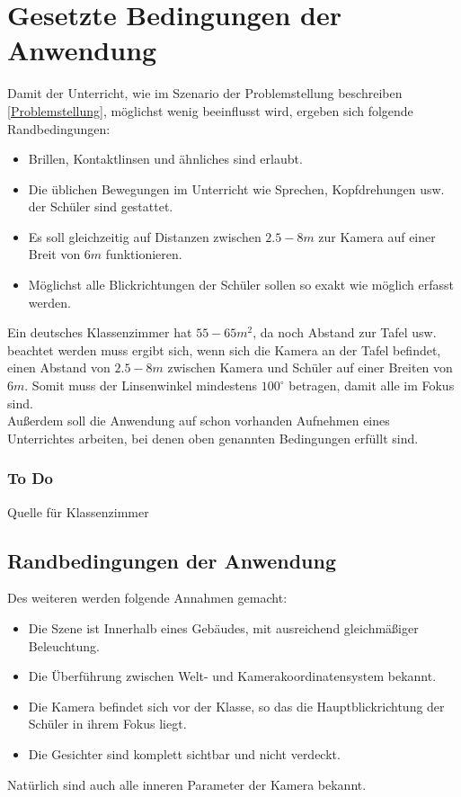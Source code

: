 \section{Gesetzte Bedingungen der Anwendung}
Damit der Unterricht, wie im Szenario der Problemstellung beschreiben \autoref{Problemstellung}, möglichst wenig beeinflusst wird, ergeben sich folgende Randbedingungen:
\begin{itemize}
\item Brillen, Kontaktlinsen und ähnliches sind erlaubt.
\item Die üblichen Bewegungen im Unterricht wie Sprechen, Kopfdrehungen usw. der Schüler sind gestattet.
\item Es soll gleichzeitig auf Distanzen zwischen $2.5 - 8m$ zur Kamera auf einer Breit von $6m$ funktionieren.
\item Möglichst alle Blickrichtungen der Schüler sollen so exakt wie möglich erfasst werden.
\end{itemize}
Ein deutsches Klassenzimmer hat $55-65m^2$, da noch Abstand zur Tafel usw. beachtet werden muss ergibt sich, wenn sich die Kamera an der Tafel befindet, einen Abstand von $2.5 - 8m$ zwischen Kamera und Schüler auf einer Breiten von $6m$. Somit muss der Linsenwinkel mindestens $100^\circ$ betragen, damit alle im Fokus sind.\\
Außerdem soll die Anwendung auf schon vorhanden Aufnehmen eines Unterrichtes arbeiten, bei denen oben genannten Bedingungen erfüllt sind.
\subsubsection{To Do}
Quelle für Klassenzimmer
\subsection{Randbedingungen der Anwendung}
Des weiteren werden folgende Annahmen gemacht:
\begin{itemize}
\item Die Szene ist Innerhalb eines Gebäudes, mit ausreichend gleichmäßiger Beleuchtung.
\item Die Überführung zwischen Welt- und Kamerakoordinatensystem bekannt.
\item Die Kamera befindet sich vor der Klasse, so das die Hauptblickrichtung der Schüler in ihrem Fokus liegt.
\item Die Gesichter sind komplett sichtbar und nicht verdeckt.
\end{itemize}
Natürlich sind auch alle inneren Parameter der Kamera bekannt.